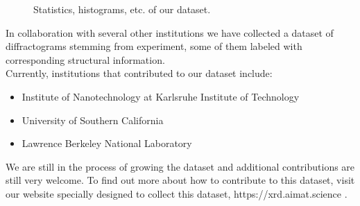 



\begin{figure*}[!ht]
    \centering
    \missingfigure{} 
    \caption{Statistics, histograms, etc. of our dataset.}
    \label{fig:statistics}
\end{figure*}

In collaboration with several other institutions we have collected a dataset of diffractograms stemming from experiment, some of them labeled with corresponding structural information. \\
Currently, institutions that contributed to our dataset include:
\begin{itemize}
    \item Institute of Nanotechnology at Karlsruhe Institute of Technology
    \item University of Southern California
    \item Lawrence Berkeley National Laboratory
\end{itemize}

We are still in the process of growing the dataset and additional contributions are still very welcome. To find out more about how to contribute to this dataset, visit our website specially designed to collect this dataset, https://xrd.aimat.science .